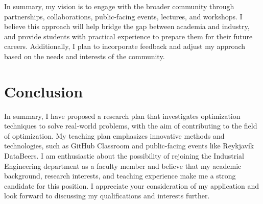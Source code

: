 \documentclass[]{cv} %
\begin{document}
In summary, my vision is to engage with the broader community through partnerships, collaborations, public-facing events, lectures, and workshops. I believe this approach will help bridge the gap between academia and industry, and provide students with practical experience to prepare them for their future careers. Additionally, I plan to incorporate feedback and adjust my approach based on the needs and interests of the community.


\section{Conclusion}
In summary, I have proposed a research plan that investigates optimization techniques to solve real-world problems, with the aim of contributing to the field of optimization. My teaching plan emphasizes innovative methods and technologies, such as GitHub Classroom and public-facing events like Reykjavík DataBeers. I am enthusiastic about the possibility of rejoining the Industrial Engineering department as a faculty member and believe that my academic background, research interests, and teaching experience make me a strong candidate for this position. I appreciate your consideration of my application and look forward to discussing my qualifications and interests further.
\end{document}
